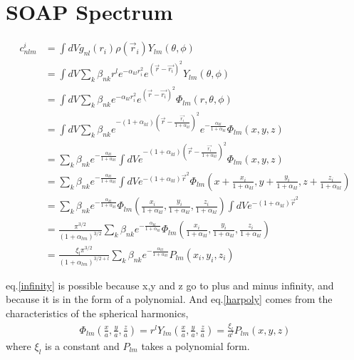 \documentclass[10pt]{article}
\begin{document}
\maketitle

\section*{SOAP Spectrum}

\begin{align}
c^i_{nlm} &= \int dV g_{nl} (r_i) \rho(\vec{r}_i) Y_{lm}(\theta, \phi) \\
          &= \int dV \sum_k \beta_{nk} r^l e^{-\alpha_{kl} r_i^2}  e^{(\vec{r} - \vec{r_i})^2} Y_{lm}(\theta, \phi) \\
          &= \int dV \sum_k \beta_{nk} e^{-\alpha_{kl} r_i^2}  e^{(\vec{r} - \vec{r_i})^2} \Phi_{lm}(r, \theta, \phi) \\
          &= \int dV \sum_k \beta_{nk} e^{- (1+\alpha_{kl})(\vec{r} - \frac{\vec{r_i}}{1+\alpha_{kl}})^2} e^{-\frac{\alpha_{kl}}{1+\alpha_{kl}}} \Phi_{lm}(x, y, z) \\
          &=  \sum_k \beta_{nk} e^{-\frac{\alpha_{kl}}{1+\alpha_{kl}}} \int dV  e^{- (1+\alpha_{kl})(\vec{r} - \frac{\vec{r_i}}{1+\alpha_{kl}})^2}  \Phi_{lm}(x, y, z) \\
          &=  \sum_k \beta_{nk} e^{-\frac{\alpha_{kl}}{1+\alpha_{kl}}} \int dV  e^{- (1+\alpha_{kl})\vec{r} ^2}  \Phi_{lm}(x+\frac{x_i}{1+\alpha_{kl}}, y +\frac{y_i}{1+\alpha_{kl}}, z+\frac{z_i}{1+\alpha_{kl}}) \label{infinity} \\
          &=  \sum_k \beta_{nk} e^{-\frac{\alpha_{kl}}{1+\alpha_{kl}}} \Phi_{lm}(\frac{x_i}{1+\alpha_{kl}}, \frac{y_i}{1+\alpha_{kl}}, \frac{z_i}{1+\alpha_{kl}}) \int dV  e^{- (1+\alpha_{kl})\vec{r} ^2}   \\
          &=  \frac{\pi^{3/2}}{(1+\alpha_{lm})^{3/2}}\sum_k \beta_{nk} e^{-\frac{\alpha_{kl}}{1+\alpha_{kl}}} \Phi_{lm}(\frac{x_i}{1+\alpha_{kl}}, \frac{y_i}{1+\alpha_{kl}}, \frac{z_i}{1+\alpha_{kl}}) \\
          &=  \frac{\xi_l\pi^{3/2}}{(1+\alpha_{lm})^{3/2 + l}}\sum_k \beta_{nk} e^{-\frac{\alpha_{kl}}{1+\alpha_{kl}}} P_{lm}(x_i, y_i, z_i)  \label{harpoly}
\end{align}

eq.\ref{infinity} is possible because x,y and z go to plus and minus infinity, and because it is in the form of a polynomial. And eq.\ref{harpoly} comes from the characteristics of the spherical harmonics,
\begin{align}
\Phi_{lm}(\frac{x}{a},\frac{y}{a},\frac{z}{a}) = r^l Y_{lm}(\frac{x}{a},\frac{y}{a},\frac{z}{a})  = \frac{\xi_l}{a^l} P_{lm}(x,y,z)
\end{align}
where $\xi_l$ is a constant and $P_{lm}$ takes a polynomial form.
\end{document}
